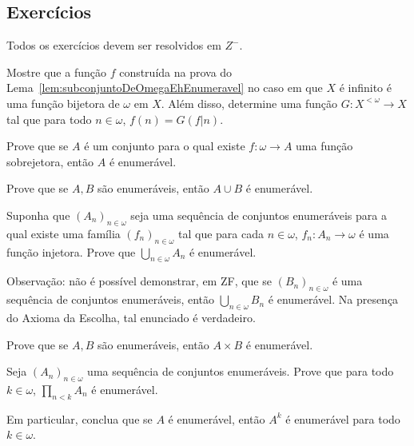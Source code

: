 \subsection*{Exercícios}

Todos os exercícios devem ser resolvidos em $Z^-$.

\begin{exercise}
    Mostre que a função $f$ construída na prova do Lema~\ref{lem:subconjuntoDeOmegaEhEnumeravel} no caso em que $X$ é infinito é uma função bijetora de $\omega$ em $X$.
    Além disso, determine uma função $G:X^{<\omega}\to X$ tal que para todo $n \in \omega$, $f(n)=G(f|n)$.
\end{exercise}
\begin{exercise}
    Prove que se $A$ é um conjunto para o qual existe $f:\omega\rightarrow A$ uma função sobrejetora, então $A$ é enumerável.
\end{exercise}
\begin{exercise}
    Prove que se $A, B$ são enumeráveis, então $A\cup B$ é enumerável.
\end{exercise}
\begin{exercise}
    Suponha que $(A_n)_{n\in\omega}$ seja uma sequência de conjuntos enumeráveis para a qual existe uma família $(f_n)_{n\in\omega}$ tal que para cada $n\in\omega$, $f_n:A_n\rightarrow \omega$ é uma função injetora.
    Prove que $\bigcup_{n\in\omega} A_n$ é enumerável.

    Observação: não é possível demonstrar, em ZF, que se $(B_n)_{n\in\omega}$ é uma sequência de conjuntos enumeráveis, então $\bigcup_{n\in\omega} B_n$ é enumerável.
    Na presença do Axioma da Escolha, tal enunciado é verdadeiro.
\end{exercise}
\begin{exercise}
    Prove que se $A, B$ são enumeráveis, então $A\times B$ é enumerável.
\end{exercise}
\begin{exercise}
    Seja $(A_n)_{n\in\omega}$ uma sequência de conjuntos enumeráveis.
    Prove que para todo $k\in \omega$, $\prod_{n<k} A_n$ é enumerável.
    
    Em particular, conclua que se $A$ é enumerável, então $A^k$ é enumerável para todo $k\in \omega$.
\end{exercise}

